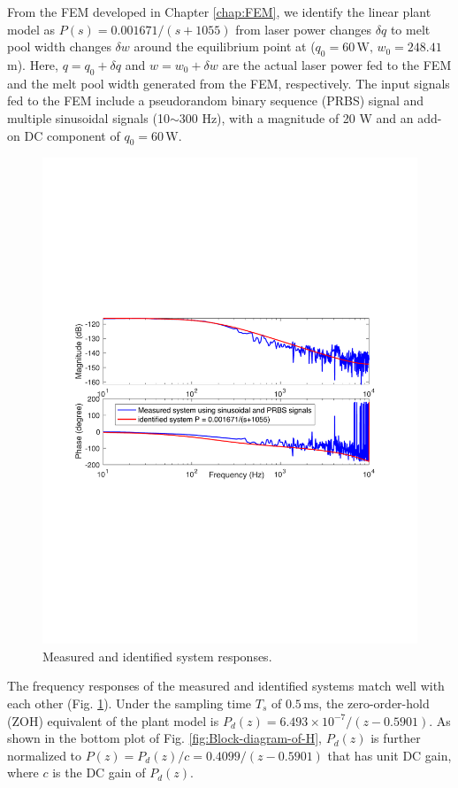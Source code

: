 \documentclass [11pt, proquest] {uwthesis}[2020/02/24]
\begin{document}
From the FEM developed in Chapter \ref{chap:FEM}, we identify the linear plant model as $P(s)=0.001671/(s+1055)$
from laser power changes $\delta q$ to melt pool width changes $\delta w$
around the equilibrium point at ($q_{0}=60\,\text{W},\,$$w_{0}=248.41\,$\textmu m).
Here, $q=q_{0}+\delta q$ and $w=w_{0}+\delta w$ are the actual laser
power fed to the FEM and the melt pool width generated from the FEM,
respectively. The input signals fed to the FEM include a pseudorandom
binary sequence (PRBS) signal and multiple sinusoidal signals (10$\sim$300
Hz), with a magnitude of 20 W and an add-on DC component of $q_{0}=60\,\text{W}$.
\begin{figure}[!ht]
\begin{centering}
\includegraphics[clip,width=13cm]{Hammerstein/systemid_measured_identified_systems}
\par\end{centering}
\centering{}\caption{\label{fig:Measured-and-identified-H}Measured and identified system
responses.}
\end{figure}
The frequency responses of the measured and identified systems match
well with each other (Fig. \ref{fig:Measured-and-identified-H}). Under
the sampling time $T_{s}$ of $0.5\,\text{ms}$, the zero-order-hold (ZOH)
equivalent of the plant model is $P_{d}(z)=6.493\times10^{-7}/(z-0.5901)$.
As shown in the bottom plot of Fig. \ref{fig:Block-diagram-of-H}, $P_{d}(z)$
is further normalized to $P(z)=P_{d}(z)/c=0.4099/(z-0.5901)$ that
has unit DC gain, where $c$ is the DC gain of $P_{d}(z)$.
\end{document}
